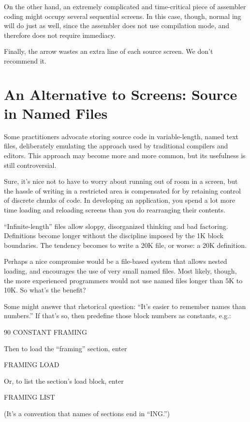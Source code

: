 On the other hand, an extremely complicated and time-critical piece
of assembler coding might occupy several sequential screens.  In this
case, though, normal ing will do just as well, since the
assembler does not use compilation mode, and therefore does not
require immediacy.

Finally, the arrow wastes an extra line of each source screen.  We
don't recommend it.%
%
%
%
%

\section{An Alternative to Screens: Source in Named Files}%

%
Some \Forth{} practitioners advocate storing source code in
variable-length, named text files, deliberately emulating the approach
used by traditional compilers and editors.  This approach may become
more and more common, but its usefulness is still controversial.

Sure, it's nice not to have to worry about running out of room in a
screen, but the hassle of writing in a restricted area is compensated
for by retaining control of discrete chunks of code.  In developing an
application, you spend a lot more time loading and reloading screens
than you do rearranging their contents.

``Infinite-length'' files allow sloppy, disorganized thinking and bad
factoring.  Definitions become longer without the discipline imposed
by the 1K block boundaries.  The tendency becomes to write a 20K file,
or worse: a 20K definition.

Perhaps a nice compromise would be a file-based system that allows
nested loading, and encourages the use of very small named files.
Most likely, though, the more experienced \Forth{} programmers would
not use named files longer than 5K to 10K.  So what's the benefit?%

Some might answer that rhetorical question: ``It's easier to remember
names than numbers.'' If that's so, then predefine those block numbers
as constants, e.g.:
\begin{Code}
90 CONSTANT FRAMING
\end{Code}
Then to load the ``framing'' section, enter
\begin{Code}
FRAMING LOAD
\end{Code}
Or, to list the section's load block, enter
\begin{Code}
FRAMING LIST
\end{Code}
(It's a convention that names of sections end in ``ING.'')

